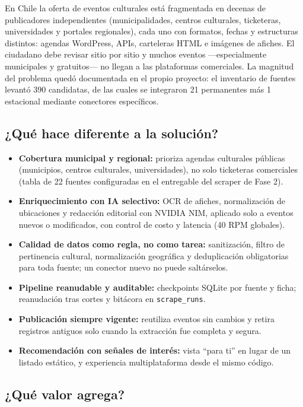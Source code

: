 En Chile la oferta de eventos culturales está fragmentada en decenas de publicadores
independientes (municipalidades, centros culturales, ticketeras, universidades y portales
regionales), cada uno con formatos, fechas y estructuras distintos: agendas WordPress, APIs,
carteleras HTML e imágenes de afiches. El ciudadano debe revisar sitio por sitio y muchos
eventos ---especialmente municipales y gratuitos--- no llegan a las plataformas comerciales.
La magnitud del problema quedó documentada en el propio proyecto: el inventario de fuentes
levantó 390 candidatas, de las cuales se integraron 21 permanentes más 1 estacional mediante
conectores específicos.

\subsection{¿Qué hace diferente a la solución?}

\begin{itemize}[leftmargin=1.4em]
    \item \textbf{Cobertura municipal y regional:} prioriza agendas culturales públicas
    (municipios, centros culturales, universidades), no solo ticketeras comerciales
    (tabla de 22 fuentes configuradas en el entregable del scraper de Fase 2).
    \item \textbf{Enriquecimiento con IA selectivo:} OCR de afiches, normalización de
    ubicaciones y redacción editorial con NVIDIA NIM, aplicado solo a eventos nuevos o
    modificados, con control de costo y latencia (40 RPM globales).
    \item \textbf{Calidad de datos como regla, no como tarea:} sanitización, filtro de
    pertinencia cultural, normalización geográfica y deduplicación obligatorias para toda
    fuente; un conector nuevo no puede saltárselos.
    \item \textbf{Pipeline reanudable y auditable:} checkpoints SQLite por fuente y ficha;
    reanudación tras cortes y bitácora en \texttt{scrape\_runs}.
    \item \textbf{Publicación siempre vigente:} reutiliza eventos sin cambios y retira
    registros antiguos solo cuando la extracción fue completa y segura.
    \item \textbf{Recomendación con señales de interés:} vista ``para ti'' en lugar de un
    listado estático, y experiencia multiplataforma desde el mismo código.
\end{itemize}

\subsection{¿Qué valor agrega?}

